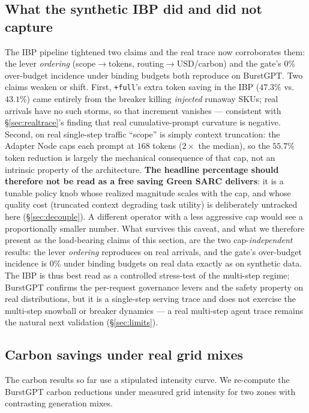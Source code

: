\documentclass[11pt]{article}
\theoremstyle{plain}
\theoremstyle{definition}
\theoremstyle{remark}
\begin{document}
\subsection{What the synthetic IBP did and did not capture}
The IBP pipeline tightened two claims and the real trace now corroborates them: the lever \emph{ordering} (scope$\to$tokens, routing$\to$USD/carbon) and the gate's $0\%$ over-budget incidence under binding budgets both reproduce on BurstGPT. Two claims weaken or shift. First, \texttt{+full}'s extra token saving in the IBP ($47.3\%$ vs.\ $43.1\%$) came entirely from the breaker killing \emph{injected} runaway SKUs; real arrivals have no such storms, so that increment vanishes --- consistent with \S\ref{sec:realtrace}'s finding that real cumulative-prompt curvature is negative. Second, on real single-step traffic ``scope'' is simply context truncation: the Adapter Node caps each prompt at $168$ tokens ($2\times$ the median), so the $55.7\%$ token reduction is largely the mechanical consequence of that cap, not an intrinsic property of the architecture. \textbf{The headline percentage should therefore not be read as a free saving Green SARC delivers}: it is a tunable policy knob whose realized magnitude scales with the cap, and whose quality cost (truncated context degrading task utility) is deliberately untracked here (\S\ref{sec:decouple}). A different operator with a less aggressive cap would see a proportionally smaller number. What survives this caveat, and what we therefore present as the load-bearing claims of this section, are the two cap-\emph{independent} results: the lever \emph{ordering} reproduces on real arrivals, and the gate's over-budget incidence is $0\%$ under binding budgets on real data exactly as on synthetic data. The IBP is thus best read as a controlled stress-test of the multi-step regime; BurstGPT confirms the per-request governance levers and the safety property on real distributions, but it is a single-step serving trace and does not exercise the multi-step snowball or breaker dynamics --- a real multi-step agent trace remains the natural next validation (\S\ref{sec:limits}).

\subsection{Carbon savings under real grid mixes}\label{sec:realgrid}
The carbon results so far use a stipulated intensity curve. We re-compute the BurstGPT carbon reductions under measured grid intensity for two zones with contrasting generation mixes.
\end{document}
